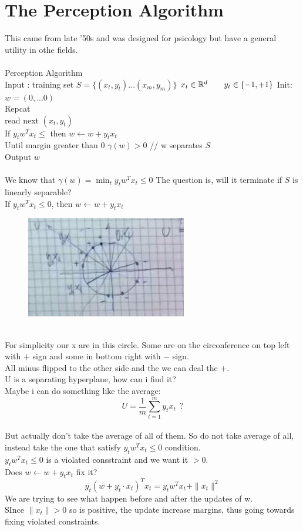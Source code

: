 \documentclass[../main.tex]{subfiles}
\begin{document}
\section{The Perception Algorithm}
This came from late '50s and was designed for psicology but have a general utility in othe fields.
\\\\
Perception Algorithm\\
Input : training set $S = \{ (x_t,y_t) ...(x_m, y_m) \}$ \qquad $x_t \in \mathbb{R}^d \qquad y_t \in \{-1, +1\}
$
Init: $w = (0,...0)$\\
Repcat\\
\quad read next $(x_t,y_t)$\\
If $y_t w^T x_t \leq$ then $w \longleftarrow w +y_t x_t$\\
Until margin greater than 0 $\gamma(w) > 0$ // w separates $S$\\
Output $w$
\\\\
We know that $\gamma(w) = \min_t y_t w^T x_t \leq 0$
The question is, will it terminate if $S$ is linearly separable?
\\
If $y_t w^T x_t \leq 0$, then $w \longleftarrow w + y_t x_t$\\
\begin{figure}[h]
    \centering
    \includegraphics[width=0.3\linewidth]{../img/lez13-img5.JPG}
    \caption{}
\end{figure}\\
For simplicity our x are in this circle. Some are on the circonference on top left with $+$ sign and some in bottom right with $-$ sign.
\\All minus flipped to the other side and the we can deal the $+$. \\
U is a separating hyperplane, how can i find it?\\
Maybe i can do something like the average: \\$$U = \frac{1}{m} \sum_{t=1}^{m} y_t x_t \ \ ?$$ \\
But actually don't take the average of all of them.
So do not take average of all, instead take the one that satisfy $y_t w^T x_t \leq 0$ condition.
\\
$y_t w^T x_t \leq 0$ is a violated consstraint and we want it $> 0$.
\\
Does $w \longleftarrow w + y_t x_t$ fix it?
$$y_t( w + y_t \cdot x_t)^T x_t = y_t w^T x_t + \| x_t\|^2$$
We are trying to see what happen before and after the updates of w.\\
SInce $\| x_t \| > 0$ so is positive, the update increase margins, thus going towards fixing violated constraints. 
\\\\
\end{document}
